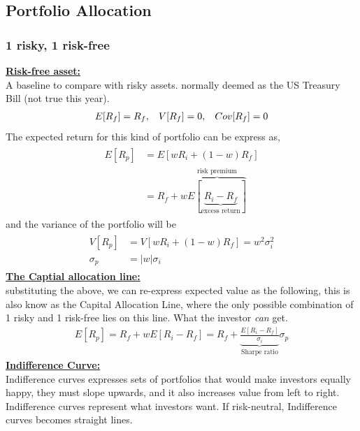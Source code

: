 \begin{multicols}{2}
\subsection{Portfolio Allocation}
\subsubsection{1 risky, 1 risk-free}
\underline{\textbf{Risk-free asset:}}\\
A baseline to compare with risky assets. normally deemed as the US Treasury Bill (not true this year). 
\begin{gather*}
    E[R_f] = R_f,\hspace*{0.3cm}V[R_f] = 0,\hspace*{0.3cm}Cov[R_f] = 0
\end{gather*}
The expected return for this kind of portfolio can be express as,
\begin{gather*}
    \begin{split}
        E[R_p] &= E[wR_i+(1-w)R_f]\\
        &= \boxed{R_f+w\overbrace{E[\underbrace{R_i-R_f}_\text{excess return}]}^\text{risk premium}}
    \end{split}
\end{gather*}
and the variance of the portfolio will be 
\begin{gather*}
    \begin{split}
       V[R_p] &= V[wR_i+(1-w)R_f]= w^2\sigma_i^2\\
        \sigma_p &= \lvert w\rvert\sigma_i
    \end{split}
\end{gather*}
\underline{\textbf{The Captial allocation line:}}\\
substituting the above, we can re-express expected value as the following, this is also know as the Capital Allocation Line, where the only possible combination of 1 risky and 1 risk-free lies on this line. What the investor \textit{can} get.
\begin{gather*}
    E[R_p] = R_f+wE[R_i-R_f] = R_f+\underbrace{\frac{E[R_i-R_f]}{\sigma_i}}_\text{Sharpe ratio}\sigma_p
\end{gather*}
\underline{\textbf{Indifference Curve:}}\\
Indifference curves expresses sets of portfolios that would make investors equally happy, they must slope upwards, and it also increases value from left to right. Indifference curves represent what investors want. If risk-neutral, Indifference curves becomes straight lines.


\end{multicols}
